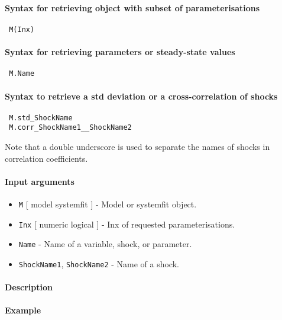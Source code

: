 


	\paragraph{Syntax for retrieving object with subset of
 parameterisations}
 
 \begin{verbatim}
 M(Inx)
 \end{verbatim}
 
 \paragraph{Syntax for retrieving parameters or steady-state values}
 
 \begin{verbatim}
 M.Name
 \end{verbatim}
 
 \paragraph{Syntax to retrieve a std deviation or a cross-correlation of
 shocks}
 
 \begin{verbatim}
 M.std_ShockName
 M.corr_ShockName1__ShockName2
 \end{verbatim}
 
 Note that a double underscore is used to separate the names of shocks in
 correlation coefficients.
 
 \paragraph{Input arguments}
 
 \begin{itemize}
 \item
   \texttt{M} {[} model \textbar{} systemfit {]} - Model or systemfit
   object.
 \item
   \texttt{Inx} {[} numeric \textbar{} logical {]} - Inx of requested
   parameterisations.
 \item
   \texttt{Name} - Name of a variable, shock, or parameter.
 \item
   \texttt{ShockName1}, \texttt{ShockName2} - Name of a shock.
 \end{itemize}
 
 \paragraph{Description}
 
 \paragraph{Example}


